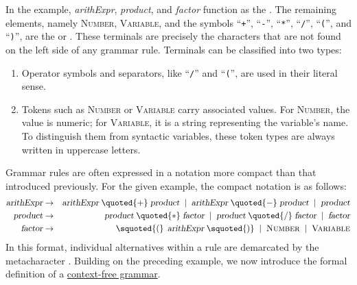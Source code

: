 In the example, \textsl{arithExpr}, \textsl{product}, and \textsl{factor} function as the . The remaining elements, namely \textsc{Number}, \textsc{Variable}, and the symbols ``\texttt{+}'', ``\texttt{-}'', ``\texttt{*}'', ``\texttt{/}'', ``\texttt{(}'', and ``\texttt{)}'', are the  or . These terminals are precisely the characters that are not found on the left side of any grammar rule. Terminals can be classified into two types:
\begin{enumerate}
\item Operator symbols and separators, like ``\texttt{/}'' and ``\texttt{(}'', are used in their literal sense.
\item Tokens such as \textsc{Number} or \textsc{Variable} carry associated values. For \textsc{Number}, the value is numeric; for \textsc{Variable}, it is a string representing the variable's name. To distinguish them from syntactic variables, these token types are always written in uppercase letters.
\end{enumerate}
Grammar rules are often expressed in a notation more compact than that introduced previously. For the given
example, the compact notation is as follows: 
\begin{eqnarray*}
  \textsl{arithExpr} & \rightarrow & \textsl{arithExpr} \;\quoted{+}\; \textsl{product} \;\mid\;
                                     \textsl{arithExpr} \;\quoted{-}\; \textsl{product} \;\mid\; 
                                     \textsl{product}                                            \\
  \textsl{product} & \rightarrow & \textsl{product} \;\quoted{*}\; \textsl{factor} \;\mid\;
                                   \textsl{product} \;\quoted{/}\; \textsl{factor} \;\mid\;
                                   \textsl{factor}                                             \\
  \textsl{factor} & \rightarrow & \squoted{(}\,\; \textsl{arithExpr} \;\squoted{)} \;\mid\; 
                                   \textsc{Number} \;\mid\; \textsc{Variable}
\end{eqnarray*}
In this format, individual alternatives within a rule are demarcated by the metacharacter \squoted{|}. Building
on the preceding example, we now introduce the formal definition of a
\href{http://en.wikipedia.org/wiki/Context-free_grammar}{context-free grammar}. 

